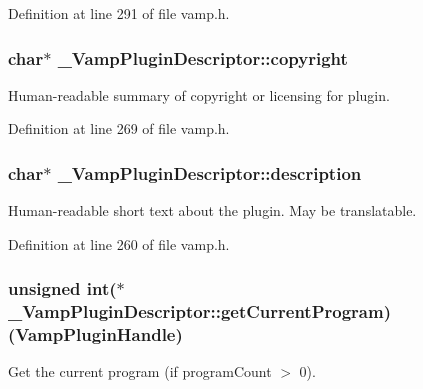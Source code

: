 Definition at line 291 of file vamp.\+h.

\subsubsection[{\texorpdfstring{copyright}{copyright}}]{ char$\ast$ \+\_\+\+Vamp\+Plugin\+Descriptor\+::copyright}\hypertarget{struct___vamp_plugin_descriptor_ae704bba384af0de056a26da1b13ee521}{}\label{struct___vamp_plugin_descriptor_ae704bba384af0de056a26da1b13ee521}
Human-\/readable summary of copyright or licensing for plugin. 

Definition at line 269 of file vamp.\+h.

\subsubsection[{\texorpdfstring{description}{description}}]{ char$\ast$ \+\_\+\+Vamp\+Plugin\+Descriptor\+::description}\hypertarget{struct___vamp_plugin_descriptor_a9ff8050f92f1a04a68bb34a9d368295e}{}\label{struct___vamp_plugin_descriptor_a9ff8050f92f1a04a68bb34a9d368295e}
Human-\/readable short text about the plugin. May be translatable. 

Definition at line 260 of file vamp.\+h.

\subsubsection[{\texorpdfstring{get\+Current\+Program}{getCurrentProgram}}]{\setlength{\rightskip}{0pt plus 5cm}unsigned {\bf int}($\ast$ \+\_\+\+Vamp\+Plugin\+Descriptor\+::get\+Current\+Program) ({\bf Vamp\+Plugin\+Handle})}\hypertarget{struct___vamp_plugin_descriptor_a2d13712798238db503005808b736cb18}{}\label{struct___vamp_plugin_descriptor_a2d13712798238db503005808b736cb18}
Get the current program (if program\+Count $>$ 0). 

